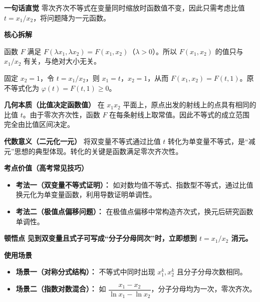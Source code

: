 \begin{explanationbox}
	\textbf{\textcolor{CExplanation}{一句话直觉}}
	零次齐次不等式在变量同时缩放时函数值不变，因此只需考虑比值 $t=x_1/x_2$，将问题降为一元函数。

	\medskip
	\textbf{\textcolor{CExplanation}{核心拆解}}
	\begin{description}[style=nextline, leftmargin=2.8em, labelsep=0.5em, itemsep=0.45em]
		\item[\textbf{要点一（零次齐次性）：}]
			函数 $F$ 满足 $F(\lambda x_1,\lambda x_2)=F(x_1,x_2)$（$\lambda>0$）。所以 $F(x_1,x_2)$ 的值只与 $x_1/x_2$ 有关，与绝对大小无关。
		\item[\textbf{要点二（比值归一化）：}]
			固定 $x_2=1$，令 $t=x_1/x_2$，则 $x_1=t$，$x_2=1$，从而 $F(x_1,x_2)=F(t,1)$。原不等式化为 $\varphi(t)=F(t,1)\ge0$。
	\end{description}

	\medskip
	\textbf{\textcolor{CExplanation}{几何本质（比值决定函数值）}}
	在 $x_1x_2$ 平面上，原点出发的射线上的点具有相同的比值 $t$。由于零次齐次性，函数 $F$ 在每条射线上取常值。因此不等式的成立范围完全由比值区间决定。

	\medskip
	\textbf{\textcolor{CExplanation}{代数意义（二元化一元）}}
	将双变量不等式通过比值 $t$ 转化为单变量不等式，是“减元”思想的典型体现。转化的关键是函数满足零次齐次性。

	\medskip
	\textbf{\textcolor{CExplanation}{考点价值（高考常见技巧）}}
	\begin{itemize}[leftmargin=*, itemsep=0.5em, topsep=0.4em]
		\item \textbf{考法一（双变量不等式证明）：} 如对数均值不等式、指数型不等式，通过比值换元化为单变量函数，利用导数证明单调性。
		\item \textbf{考法二（极值点偏移问题）：} 在极值点偏移中常构造齐次式，换元后研究函数单调性。
	\end{itemize}

	\medskip
	\textbf{\textcolor{CExplanation}{顿悟点}}
	\textbf{见到双变量且式子可写成“分子分母同次”时，立即想到 $t=x_1/x_2$ 消元。}

	\medskip
	\textbf{\textcolor{CExplanation}{使用场景}}
	\begin{itemize}[leftmargin=*, itemsep=0.5em, topsep=0.4em]
		\item \textbf{场景一（对称分式结构）：} 不等式中同时出现 $x_1^k,x_2^k$ 且分子分母次数相同。
		\item \textbf{场景二（指数对数混合）：} 如 $\dfrac{x_1-x_2}{\ln x_1-\ln x_2}$，分子分母均为一次，零次齐次。
	\end{itemize}

\end{explanationbox}
